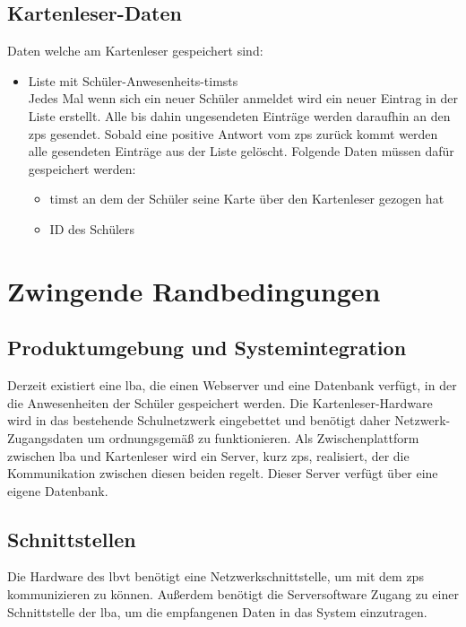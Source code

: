 \subsection{Kartenleser-Daten}
Daten welche am Kartenleser gespeichert sind:
\begin{itemize}[leftmargin=1.0in]
    \item [\ld] Liste mit Schüler-Anwesenheits-\gls{timst}s \\
    Jedes Mal wenn sich ein neuer Schüler anmeldet wird ein neuer Eintrag in der Liste erstellt. Alle bis dahin ungesendeten Einträge werden daraufhin an den \gls{zps} gesendet. Sobald eine positive Antwort vom \gls{zps} zurück kommt werden alle gesendeten Einträge aus der Liste gelöscht. Folgende Daten müssen dafür gespeichert werden:
    \begin{itemize}
        \item \gls{timst} an dem der Schüler seine Karte über den Kartenleser gezogen hat
        \item ID des Schülers
    \end{itemize}
\end{itemize}


\section{Zwingende Randbedingungen}
\subsection{Produktumgebung und Systemintegration}
Derzeit existiert eine \gls{lba}, die einen Webserver und eine Datenbank verfügt, in der die Anwesenheiten der Schüler gespeichert werden. 
Die Kartenleser-Hardware wird in das bestehende Schulnetzwerk eingebettet und benötigt daher Netzwerk-Zugangsdaten um ordnungsgemäß zu funktionieren.
Als Zwischenplattform zwischen \gls{lba} und Kartenleser wird ein Server, kurz \gls{zps}, realisiert, der die Kommunikation zwischen diesen beiden regelt. Dieser Server verfügt über eine eigene Datenbank. 
\subsection{Schnittstellen}
Die Hardware des \gls{lbvt} benötigt eine Netzwerkschnittstelle, um mit dem \gls{zps} kommunizieren zu können. Außerdem benötigt die Serversoftware Zugang zu einer Schnittstelle der \gls{lba}, um die empfangenen Daten in das System einzutragen.

